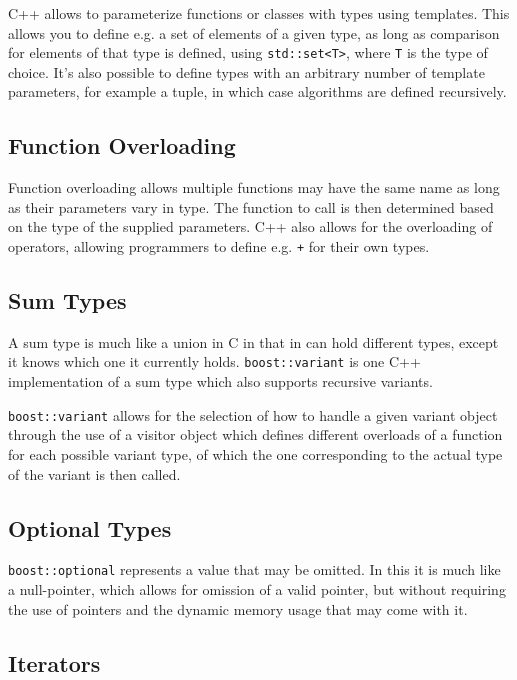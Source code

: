 		C++ allows to parameterize functions or classes with types using templates. This allows you to define e.g. a set of elements of a given type, as long as comparison for elements of that type is defined, using \lstinline$std::set<T>$, where \lstinline$T$ is the type of choice. It's also possible to define types with an arbitrary number of template parameters, for example a tuple, in which case algorithms are defined recursively.
		
		\subsection{Function Overloading}
		
		Function overloading allows multiple functions may have the same name as long as their parameters vary in type. The function to call is then determined based on the type of the supplied parameters. C++ also allows for the overloading of operators, allowing programmers to define e.g. \lstinline$+$ for their own types.
		
		\subsection{Sum Types}
		
		A sum type is much like a union in C in that in can hold different types, except it knows which one it currently holds. \lstinline$boost::variant$ is one C++ implementation of a sum type which also supports recursive variants.
		
		\lstinline$boost::variant$ allows for the selection of how to handle a given variant object through the use of a visitor object which defines different overloads of a function for each possible variant type, of which the one corresponding to the actual type of the variant is then called.
		
		\subsection{Optional Types}
		
		\lstinline$boost::optional$ represents a value that may be omitted. In this it is much like a null-pointer, which allows for omission of a valid pointer, but without requiring the use of pointers and the dynamic memory usage that may come with it.
		
		\subsection{Iterators}
		
